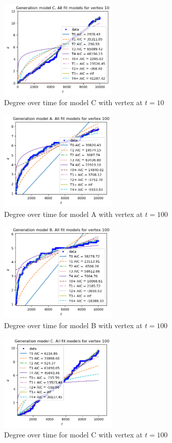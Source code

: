 \documentclass[a4paper]{article}
\begin{document}
%
\begin{figure}[H]
		\centering
		\includegraphics[width=0.5\textwidth]{modelC/all_dt10.png}
		\caption{Degree over time for model C with vertex at $t=10$}
\end{figure}
%
\begin{figure}[H]
    \centering
		\includegraphics[width=0.5\textwidth]{modelA/all_dt100.png}
		\caption{Degree over time for model A with vertex at $t=100$}
\end{figure}
%
\begin{figure}[H]
    \centering
		\includegraphics[width=0.5\textwidth]{modelB/all_dt100.png}
		\caption{Degree over time for model B with vertex at $t=100$}
\end{figure}
%
\begin{figure}[H]
		\centering
		\includegraphics[width=0.5\textwidth]{modelC/all_dt100.png}
		\caption{Degree over time for model C with vertex at $t=100$}
\end{figure}
\end{document}
